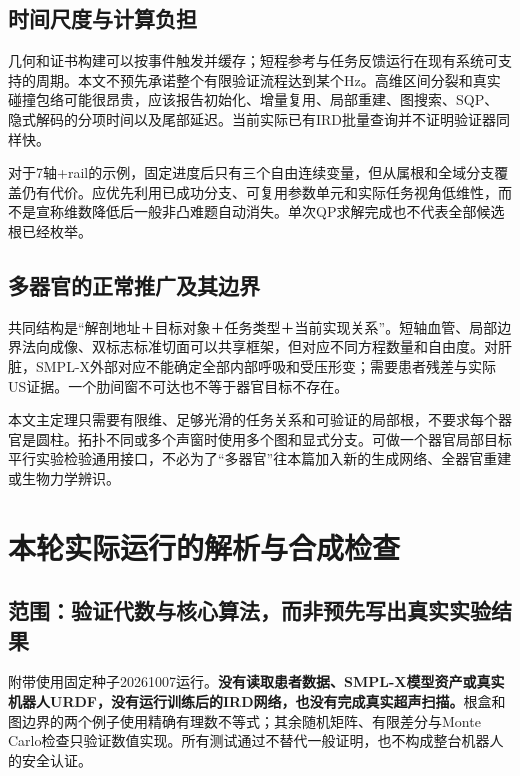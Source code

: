 \documentclass[UTF8,11pt,a4paper,fontset=fandol]{ctexart}
\numberwithin{equation}{section}
\theoremstyle{definition}
\begin{document}
\subsection{时间尺度与计算负担}
几何和证书构建可以按事件触发并缓存；短程参考与任务反馈运行在现有系统可支持的周期。本文不预先承诺整个有限验证流程达到某个Hz。高维区间分裂和真实碰撞包络可能很昂贵，应该报告初始化、增量复用、局部重建、图搜索、SQP、隐式解码的分项时间以及尾部延迟。当前实际已有IRD批量查询并不证明验证器同样快。

对于7轴+rail的示例，固定进度后只有三个自由连续变量，但从属根和全域分支覆盖仍有代价。应优先利用已成功分支、可复用参数单元和实际任务视角低维性，而不是宣称维数降低后一般非凸难题自动消失。单次QP求解完成也不代表全部候选根已经枚举。

\subsection{多器官的正常推广及其边界}
共同结构是“解剖地址＋目标对象＋任务类型＋当前实现关系”。短轴血管、局部边界法向成像、双标志标准切面可以共享框架，但对应不同方程数量和自由度。对肝脏，SMPL-X外部对应不能确定全部内部呼吸和受压形变；需要患者残差与实际US证据。一个肋间窗不可达也不等于器官目标不存在。

本文主定理只需要有限维、足够光滑的任务关系和可验证的局部根，不要求每个器官是圆柱。拓扑不同或多个声窗时使用多个图和显式分支。可做一个器官局部目标平行实验检验通用接口，不必为了“多器官”往本篇加入新的生成网络、全器官重建或生物力学辨识。

\section{本轮实际运行的解析与合成检查}
\subsection{范围：验证代数与核心算法，而非预先写出真实实验结果}
附带使用固定种子20261007运行。\textbf{没有读取患者数据、SMPL-X模型资产或真实机器人URDF，没有运行训练后的IRD网络，也没有完成真实超声扫描。}根盒和图边界的两个例子使用精确有理数不等式；其余随机矩阵、有限差分与Monte Carlo检查只验证数值实现。所有测试通过不替代一般证明，也不构成整台机器人的安全认证。
\end{document}
